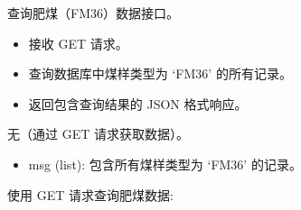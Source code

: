 \documentclass[a4paper,12pt,english]{sphinxmanual}
\begin{document}
\begin{fulllineitems}
\label{\detokenize{api/login:login.getFeiCoalgData}}
\pysigstartsignatures
{}
\pysigstopsignatures
\sphinxAtStartPar
查询肥煤（FM36）数据接口。
\begin{description}
\begin{itemize}
\item {} 
\sphinxAtStartPar
接收 GET 请求。

\item {} 
\sphinxAtStartPar
查询数据库中煤样类型为 ‘FM36’ 的所有记录。

\item {} 
\sphinxAtStartPar
返回包含查询结果的 JSON 格式响应。

\end{itemize}

\sphinxAtStartPar
无（通过 GET 请求获取数据）。

\begin{description}
\begin{itemize}
\item {} 
\sphinxAtStartPar
msg (list): 包含所有煤样类型为 ‘FM36’ 的记录。

\end{itemize}

\end{description}

\sphinxAtStartPar
使用 GET 请求查询肥煤数据:

\begin{sphinxVerbatim}[commandchars=\\\{\}]
 


\end{sphinxVerbatim}
\end{description}
\end{fulllineitems}
\end{document}
